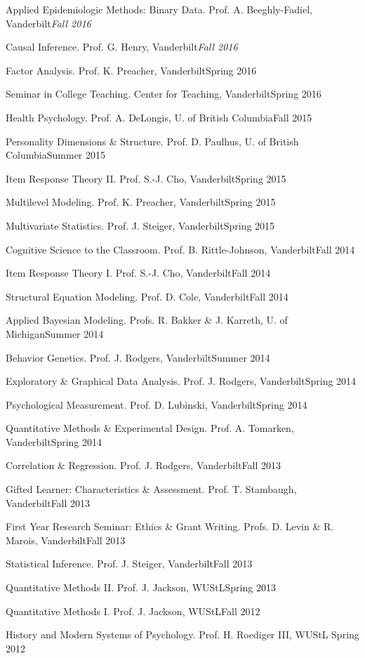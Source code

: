 \begin{etaremune}
\item Applied Epidemiologic Methods: Binary Data. Prof. A. Beeghly-Fadiel, Vanderbilt\hfill{\textit{Fall 2016}}
\item Causal Inference. Prof. G. Henry, Vanderbilt\hfill{\textit{Fall 2016}}
\item Factor Analysis. Prof. K. Preacher, Vanderbilt\hfill{Spring 2016}
\item Seminar in College Teaching. Center for Teaching, Vanderbilt\hfill{Spring 2016}
\item Health Psychology.  Prof. A. DeLongis, U. of British Columbia\hfill{Fall 2015}
\item Personality Dimensions \& Structure.  Prof. D. Paulhus, U. of British Columbia\hfill{Summer 2015}
\item Item Response Theory \textrm{II}. Prof. S.-J. Cho, Vanderbilt\hfill{Spring 2015}
\item Multilevel Modeling. Prof. K. Preacher, Vanderbilt\hfill{Spring 2015}
\item Multivariate Statistics. Prof. J. Steiger, Vanderbilt\hfill{Spring 2015}
\item Cognitive Science to the Classroom. Prof. B. Rittle-Johnson, Vanderbilt\hfill{Fall 2014}
\item Item Response Theory \textrm{I}. Prof. S.-J. Cho, Vanderbilt\hfill{Fall 2014}
\item Structural Equation Modeling. Prof. D. Cole, Vanderbilt\hfill{Fall 2014}
\item Applied Bayesian Modeling. Profs. R. Bakker \& J. Karreth, U. of Michigan\hfill{Summer 2014}
\item Behavior Genetics. Prof. J. Rodgers, Vanderbilt\hfill{Summer 2014}
\item Exploratory \& Graphical Data Analysis. Prof. J. Rodgers, Vanderbilt\hfill{Spring 2014}
\item Psychological Measurement. Prof. D. Lubinski, Vanderbilt\hfill{Spring 2014}
\item Quantitative Methods \& Experimental Design. Prof. A. Tomarken, Vanderbilt\hfill{Spring 2014}
\item Correlation \& Regression. Prof. J. Rodgers, Vanderbilt\hfill{Fall 2013}
\item Gifted Learner: Characteristics \& Assessment. Prof. T. Stambaugh, Vanderbilt\hfill{Fall 2013}
\item First Year Research Seminar: Ethics \& Grant Writing. Profs. D. Levin \& R. Marois, Vanderbilt\hfill{Fall 2013}
\item Statistical Inference. Prof. J. Steiger, Vanderbilt\hfill{Fall 2013}
\item Quantitative Methods \textrm{II}. Prof. J. Jackson, WUStL\hfill{Spring 2013}
\item Quantitative Methods \textrm{I}. Prof. J. Jackson, WUStL\hfill{Fall 2012}
\item History and Modern Systems of Psychology. Prof. H. Roediger \textrm{III}, WUStL \hfill{Spring 2012}\end{etaremune}